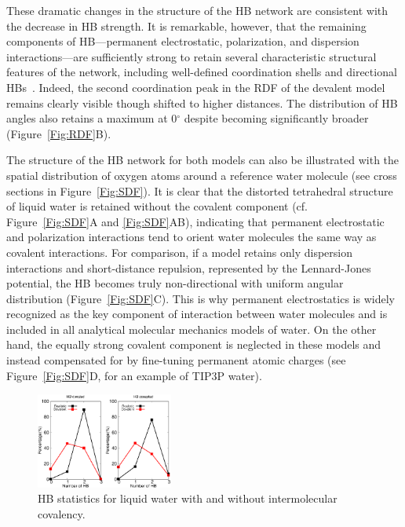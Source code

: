 \documentclass[journal=jacsat,manuscript=article]{achemso}
\begin{document}
These dramatic changes in the structure of the HB network are consistent with the decrease in HB strength. 
It is remarkable, however, that the remaining components of HB---permanent electrostatic, polarization, and dispersion interactions---are sufficiently strong to retain several characteristic structural features of the network, including well-defined coordination shells and directional HBs~\cite{arunan2011definition}.
Indeed, the second coordination peak in the RDF of the devalent model remains clearly visible though shifted to higher distances. 
The distribution of HB angles also retains a maximum at 0$^\circ$ despite becoming significantly broader (Figure~\ref{Fig:RDF}B).

The structure of the HB network for both models can also be illustrated with the spatial distribution of oxygen atoms around a reference water molecule (see cross sections in Figure~\ref{Fig:SDF}). 
It is clear that the distorted tetrahedral structure of liquid water is retained without the covalent component (cf. Figure~\ref{Fig:SDF}A and \ref{Fig:SDF}AB), indicating that permanent electrostatic and polarization interactions tend to orient water molecules the same way as covalent interactions. 
For comparison, if a model retains only dispersion interactions and short-distance repulsion, represented by the Lennard-Jones potential, the HB becomes truly non-directional with uniform angular distribution (Figure~\ref{Fig:SDF}C). 
This is why permanent electrostatics is widely recognized as the key component of interaction between water molecules and is included in all analytical molecular mechanics models of water. 
On the other hand, the equally strong covalent component is neglected in these models and instead compensated for by fine-tuning permanent atomic charges (see Figure~\ref{Fig:SDF}D, for an example of TIP3P water). 

\begin{figure}
\includegraphics[width=0.4\textwidth]{new_hbstat}
\caption{HB statistics for liquid water with and without intermolecular covalency.}\label{fig:HBstat}
\end{figure}
\end{document}
